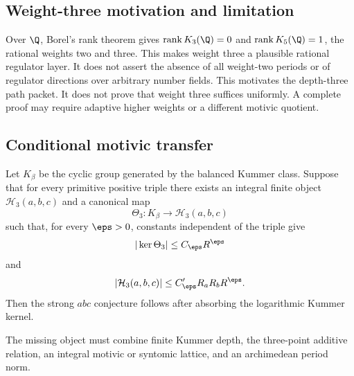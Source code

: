 \subsection{Weight-three motivation and limitation}
Over $\Q$, Borel's rank theorem gives $\operatorname{rank}K_3(\Q)=0$ and $\operatorname{rank}K_5(\Q)=1$, the rational weights two and three. This makes weight three a plausible rational regulator layer. It does not assert the absence of all weight-two periods or of regulator directions over arbitrary number fields. This motivates the depth-three path packet. It does not prove that weight three suffices uniformly. A complete proof may require adaptive higher weights or a different motivic quotient.

\subsection{Conditional motivic transfer}
Let $K_\beta$ be the cyclic group generated by the balanced Kummer class. Suppose that for every primitive positive triple there exists an integral finite object $\mathcal H_3(a,b,c)$ and a canonical map
\[
 \Theta_3:K_\beta\longrightarrow\mathcal H_3(a,b,c)
\]
such that, for every $\eps>0$, constants independent of the triple give
\[
 |\ker\Theta_3|\le C_\eps R^\eps
\]
and
\[
 |\mathcal H_3(a,b,c)|\le C'_\eps R_aR_bR^\eps.
\]
Then the strong $abc$ conjecture follows after absorbing the logarithmic Kummer kernel.

The missing object must combine finite Kummer depth, the three-point additive relation, an integral motivic or syntomic lattice, and an archimedean period norm.

